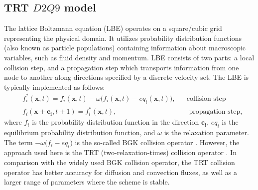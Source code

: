 \documentclass{article}
\begin{document}
\subsection{TRT $D2Q9$ model}
The lattice Boltzmann equation (LBE) operates on a square/cubic grid representing the
physical domain. It utilizes
probability distribution functions (also known as particle populations)
containing information about
macroscopic variables, such as fluid density and momentum. LBE consists of
two parts: a local collision step, and a propagation step which transports
information from one node to another along  
directions specified by a discrete velocity set.
The LBE is typically implemented as follows:
\begin{equation}
\label{standard:implementation}
\begin{aligned}
&f_i^{*}(\bm{x},t)= f_i(\bm{x},t)-\omega \bigl(f_i(\bm{x},t)-eq_i(\bm{x},t)\bigr),&&\text{
collision step}\\
&f_i(\bm{x}+\bm{c_i},t+1)=f_i^{*}(\bm{x},t),&&\text{ propagation step}, 
\end{aligned}
\end{equation}
where $f_i$ is the probability distribution function in the direction $\bm{c_i}$,
 $eq_i$ is the equilibrium probability distribution function, and $\omega$ is the
relaxation parameter. The term $-\omega \bigl(f_i- eq_i\bigr)$ is the so-called BGK
collision operator \cite{bgk}. However, the approach used here is the TRT
(two-relaxation-times) collision operator \cite{ginzburg-main,ginzburg-saturated-flow}. In
comparison with the widely used BGK collision operator, the TRT collision operator has better accuracy
for diffusion and convection fluxes, as well as a larger range of parameters where the scheme is stable.
\end{document}
